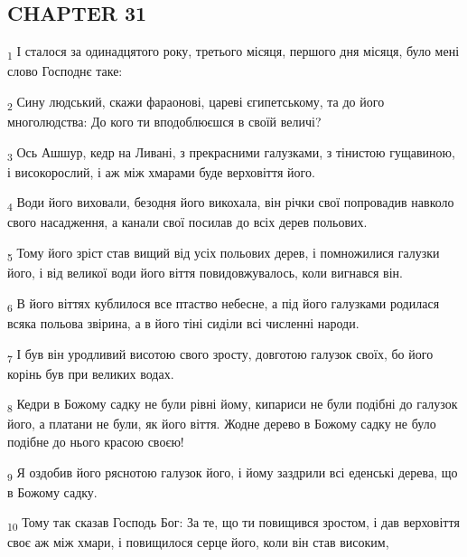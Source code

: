 \subsection{CHAPTER 31}
\begin{tcolorbox}
\textsubscript{1} І сталося за одинадцятого року, третього місяця, першого дня місяця, було мені слово Господнє таке:
\end{tcolorbox}
\begin{tcolorbox}
\textsubscript{2} Сину людський, скажи фараонові, цареві єгипетському, та до його многолюдства: До кого ти вподоблюєшся в своїй величі?
\end{tcolorbox}
\begin{tcolorbox}
\textsubscript{3} Ось Ашшур, кедр на Ливані, з прекрасними галузками, з тінистою гущавиною, і високорослий, і аж між хмарами буде верховіття його.
\end{tcolorbox}
\begin{tcolorbox}
\textsubscript{4} Води його виховали, безодня його викохала, він річки свої попровадив навколо свого насадження, а канали свої посилав до всіх дерев польових.
\end{tcolorbox}
\begin{tcolorbox}
\textsubscript{5} Тому його зріст став вищий від усіх польових дерев, і помножилися галузки його, і від великої води його віття повидовжувалось, коли вигнався він.
\end{tcolorbox}
\begin{tcolorbox}
\textsubscript{6} В його віттях кублилося все птаство небесне, а під його галузками родилася всяка польова звірина, а в його тіні сиділи всі численні народи.
\end{tcolorbox}
\begin{tcolorbox}
\textsubscript{7} І був він уродливий висотою свого зросту, довготою галузок своїх, бо його корінь був при великих водах.
\end{tcolorbox}
\begin{tcolorbox}
\textsubscript{8} Кедри в Божому садку не були рівні йому, кипариси не були подібні до галузок його, а платани не були, як його віття. Жодне дерево в Божому садку не було подібне до нього красою своєю!
\end{tcolorbox}
\begin{tcolorbox}
\textsubscript{9} Я оздобив його ряснотою галузок його, і йому заздрили всі еденські дерева, що в Божому садку.
\end{tcolorbox}
\begin{tcolorbox}
\textsubscript{10} Тому так сказав Господь Бог: За те, що ти повищився зростом, і дав верховіття своє аж між хмари, і повищилося серце його, коли він став високим,
\end{tcolorbox}
